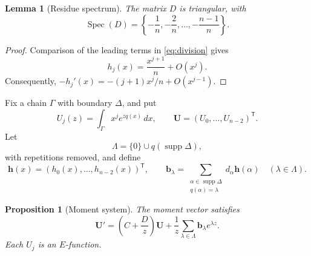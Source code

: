 \documentclass[11pt]{article}
\numberwithin{equation}{section}
\newtheorem{proposition}[proposition]{Proposition}
\newtheorem{lemma}[lemma]{Lemma}
\theoremstyle{definition}
\theoremstyle{remark}
\newcommand{\Spec}{\operatorname{Spec}}
\newcommand{\supp}{\operatorname{supp}}
\begin{document}
\begin{lemma}[Residue spectrum]\label{lem:D-spectrum}
The matrix $D$ is triangular, with
\begin{equation}\label{eq:D-spectrum}
  \Spec(D)=
  \left\{-\frac1n,-\frac2n,\ldots,-\frac{n-1}{n}\right\}.
\end{equation}
\end{lemma}

\begin{proof}
Comparison of the leading terms in \eqref{eq:division} gives
\[
  h_j(x)=\frac{x^{j+1}}n+O(x^j).
\]
Consequently,
$-h_j'(x)=-(j+1)x^j/n+O(x^{j-1})$.
\end{proof}

Fix a chain $\Gamma$ with boundary $\Delta$, and put
\begin{equation}\label{eq:U}
  U_j(z)=\int_\Gamma x^j e^{zq(x)}\,dx,
  \qquad
  \mathbf U=(U_0,\ldots,U_{n-2})^{\mathsf T}.
\end{equation}
Let
\begin{equation}\label{eq:Lambda}
  \Lambda=\{0\}\cup q(\supp\Delta),
\end{equation}
with repetitions removed, and define
\[
  \mathbf h(x)=(h_0(x),\ldots,h_{n-2}(x))^{\mathsf T},
  \qquad
  \mathbf b_\lambda=
  \sum_{\substack{\alpha\in\supp\Delta\\q(\alpha)=\lambda}}
     d_\alpha\mathbf h(\alpha)
  \quad(\lambda\in\Lambda).
\]

\begin{proposition}[Moment system]\label{prop:moment-system}
The moment vector satisfies
\begin{equation}\label{eq:moment-system}
  \mathbf U'
  =\left(C+\frac Dz\right)\mathbf U
   +\frac1z\sum_{\lambda\in\Lambda}
      \mathbf b_\lambda e^{\lambda z}.
\end{equation}
Each $U_j$ is an $E$-function.
\end{proposition}
\end{document}
